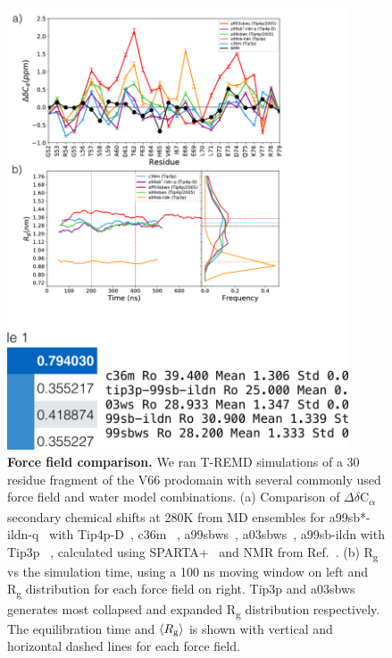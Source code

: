 \documentclass[10pt,letterpaper]{article}
\renewcommand{\figurename}{Fig}
\begin{document}
\renewcommand{\thepage}{S\arabic{page}}  
\renewcommand{\thesection}{S\arabic{section}}   
\renewcommand{\thetable}{S\arabic{table}}   
\renewcommand{\figurename}{}
\renewcommand{\thefigure}{S\arabic{figure} Fig}

\clearpage
\begin{figure}[!ht]
\includegraphics[scale=0.5,width=0.9\textwidth,trim={0 0cm 0 0cm},clip]{./figures/S1.pdf}
\caption{{\bf Force field comparison.} We ran T-REMD simulations of a 30 residue fragment of the V66 prodomain with several commonly used force field and water model combinations. (a) Comparison of $\Delta$$\delta$C\textsubscript{$\alpha$} secondary chemical shifts at 280K from MD ensembles for a99sb*-ildn-q~\cite {Lindorff-Larsen2010a, Hornak2006a} with Tip4p-D~\cite{Piana2015},  c36m ~\cite{Huang2016a}, a99sbws~\cite{Lindorff-Larsen2010a, Best2014}, a03sbws~\cite {Best2009, Best2014}, a99sb-ildn with Tip3p ~\cite {Jorgensen1981}, calculated using SPARTA+~\cite{Shen2010} and NMR from Ref.~. (b) R\textsubscript{g} vs the simulation time, using a 100 ns moving window on left and R\textsubscript{g} distribution for each force field on right. Tip3p and a03sbws generates most collapsed and expanded R\textsubscript{g} distribution respectively. The equilibration time and $\langle R\textsubscript{g} \rangle$ is shown with vertical and horizontal dashed lines for each force field.}
\label{S1} 
\end{figure}
\end{document}
